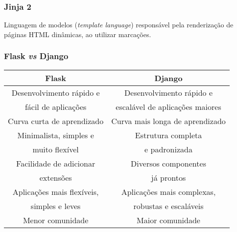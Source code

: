 \documentclass[t]{beamer}
\begin{document}
\begin{frame}
	\frametitle{Jinja 2}
	Linguagem de modelos (\textit{template language}) responsável pela renderização de páginas HTML dinâmicas, ao utilizar marcações.
	
	
\end{frame}

\begin{frame}
	\frametitle{Flask \textit{vs} Django}
	\begin{table}[]
		\begin{tabular}{|c|c|}
			\hline
			Flask & Django\\\hline
			Desenvolvimento rápido e & Desenvolvimento rápido e\\
			fácil de aplicações & escalável de aplicações maiores\\\hline
			Curva curta de aprendizado & Curva mais longa de aprendizado\\\hline
			Minimalista, simples e & Estrutura completa\\
			muito flexível & e padronizada\\\hline
			Facilidade de adicionar  & Diversos componentes\\
			extensões & já prontos\\\hline
			Aplicações mais flexíveis, & Aplicações mais complexas,\\
			simples e leves & robustas e escaláveis\\\hline
			Menor comunidade & Maior comunidade\\\hline
		\end{tabular}
	\end{table}
\end{frame}
\end{document}

